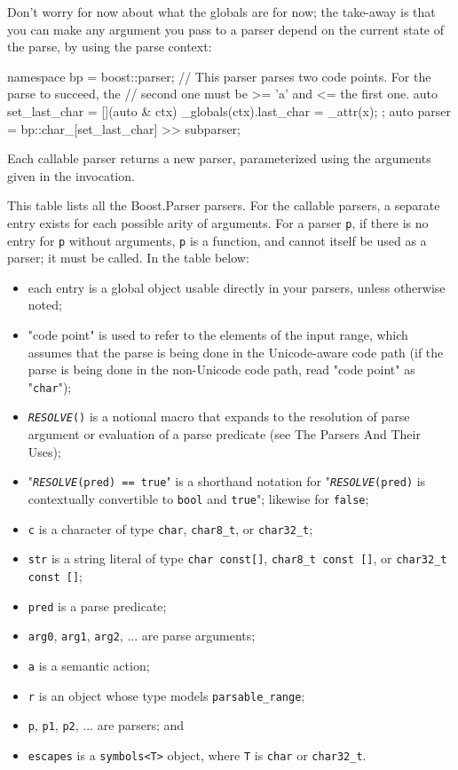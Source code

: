 Don't worry for now about what the globals are for now; the take-away is that you can make any argument you pass to a parser depend on the current state of the parse, by using the parse context:

\begin{code}
namespace bp = boost::parser;
// This parser parses two code points.  For the parse to succeed, the
// second one must be >= 'a' and <= the first one.
auto set_last_char = [](auto & ctx) { _globals(ctx).last_char = _attr(x); };
auto parser = bp::char_[set_last_char] >> subparser;
\end{code}

Each callable parser returns a new parser, parameterized using the arguments given in the invocation.

This table lists all the Boost.Parser parsers. For the callable parsers, a separate entry exists for each possible arity of arguments. For a parser \texttt{p}, if there is no entry for \texttt{p} without arguments, \texttt{p} is a function, and cannot itself be used as a parser; it must be called. In the table below:

\begin{itemize}
\item
  each entry is a global object usable directly in your parsers, unless otherwise noted;
\item
  "code point" is used to refer to the elements of the input range, which assumes that the parse is being done in the Unicode-aware code path (if the parse is being done in the non-Unicode code path, read "code point" as "\texttt{char}");
\item
  \emph{\texttt{RESOLVE}}\texttt{()} is a notional macro that expands to the resolution of parse argument or evaluation of a parse predicate (see The Parsers And Their Uses);
\item
  "\emph{\texttt{RESOLVE}}\texttt{(pred) == true}" is a shorthand notation for "\emph{\texttt{RESOLVE}}\texttt{(pred)} is contextually convertible to \texttt{bool} and \texttt{true}"; likewise for \texttt{false};
\item
  \texttt{c} is a character of type \texttt{char}, \texttt{char8\_t}, or \texttt{char32\_t};
\item
  \texttt{str} is a string literal of type \texttt{char const{[}{]}}, \texttt{char8\_t const {[}{]}}, or \texttt{char32\_t const {[}{]}};
\item
  \texttt{pred} is a parse predicate;
\item
  \texttt{arg0}, \texttt{arg1}, \texttt{arg2}, ... are parse arguments;
\item
  \texttt{a} is a semantic action;
\item
  \texttt{r} is an object whose type models \texttt{parsable\_range};
\item
  \texttt{p}, \texttt{p1}, \texttt{p2}, ... are parsers; and
\item
  \texttt{escapes} is a \texttt{symbols<T>} object, where \texttt{T} is \texttt{char} or \texttt{char32\_t}.
\end{itemize}

